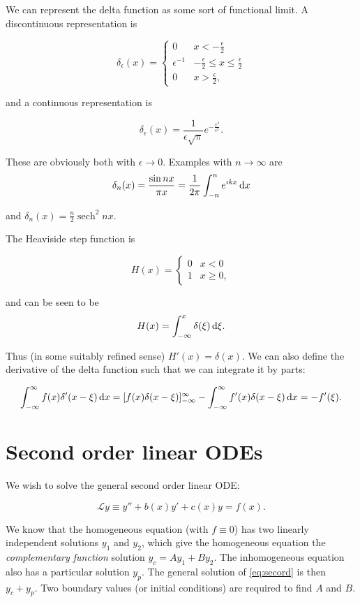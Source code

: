 \documentclass{notes}
\theoremstyle{plain}
\newcommand{\cL}{\mathcal{L}}
\DeclareMathOperator{\sech}{sech}
\begin{document}
We can represent the delta function as some sort of functional limit.
A discontinuous representation is

\[
\delta_\epsilon(x) = \begin{cases}
0 & x < - \frac{\epsilon}{2} \\
\epsilon^{-1} & - \frac{\epsilon}{2} \le x \le \frac{\epsilon}{2} \\
0 & x > \frac{\epsilon}{2},
\end{cases}
\]

and a continuous representation is

\[
\delta_\epsilon(x) = \frac{1}{\epsilon \sqrt{\pi}} e^{-\frac{x^2}{\epsilon^2}}.
\]

These are obviously both with $\epsilon \to 0$.  Examples with $n \to
\infty$ are
\[
\delta_n(x) = \frac{\sin n x}{\pi x} = \frac{1}{2 \pi} \int_{-n}^n
e^{\imath k x}\, \mathrm{d} x
\]

and $\delta_n(x) = \frac{n}{2} \sech^2 n x$.

The Heaviside step function is

\[
H(x) = \begin{cases}
0 & x < 0 \\ 1 & x \ge 0,
\end{cases}
\]

and can be seen to be
\[
H(x) = \int_{-\infty}^x \delta(\xi)\, \mathrm{d} \xi.
\]

Thus (in some suitably refined sense) $H'(x) = \delta(x)$.  We can also
define the derivative of the delta function such that we can integrate
it by parts:

\[
\int_{-\infty}^\infty f(x) \delta'(x - \xi)\, \mathrm{d} x =
[ f(x) \delta(x-\xi) ]_{-\infty}^\infty - \int_{-\infty}^\infty f'(x)
\delta(x- \xi)\, \mathrm{d} x = -f'(\xi).
\]

\section{Second order linear ODEs}

We wish to solve the general second order linear ODE:

\begin{equation}\label{eq:secord}
\cL y \equiv y'' + b(x) y' + c(x) y = f(x).
\end{equation}

We know that the homogeneous equation (with $f \equiv 0$) has two
linearly independent solutions $y_1$ and $y_2$, which give the
homogeneous equation the \emph{complementary function} solution $y_c
= A y_1 + B y_2$.  The inhomogeneous equation also has a particular
solution $y_p$.  The general solution of \eqref{eq:secord} is then
$y_c + y_p$.  Two boundary values (or initial conditions) are required
to find $A$ and $B$.
\end{document}
